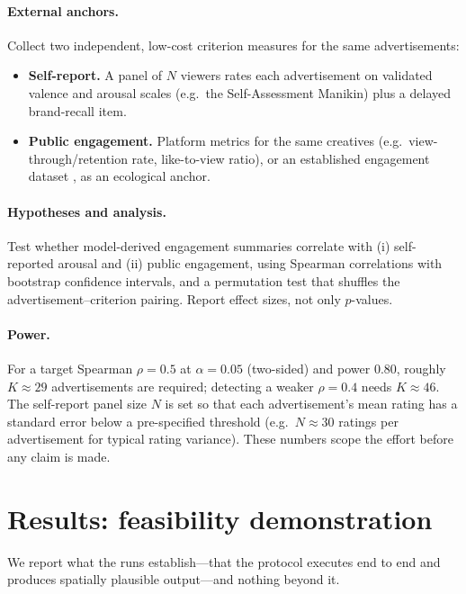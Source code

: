\documentclass[11pt]{article}
\begin{document}
\paragraph{External anchors.} Collect two independent, low-cost criterion
measures for the same advertisements:
\begin{itemize}[leftmargin=1.4em,itemsep=0.1em,topsep=0.2em]
  \item \textbf{Self-report.} A panel of $N$ viewers rates each advertisement
  on validated valence and arousal scales (e.g.\ the Self-Assessment Manikin)
  plus a delayed brand-recall item.
  \item \textbf{Public engagement.} Platform metrics for the same creatives
  (e.g.\ view-through/retention rate, like-to-view ratio), or an established
  engagement dataset \citep{kaggleads}, as an ecological anchor.
\end{itemize}

\paragraph{Hypotheses and analysis.} Test whether model-derived engagement
summaries correlate with (i) self-reported arousal and (ii) public engagement,
using Spearman correlations with bootstrap confidence intervals, and a
permutation test that shuffles the advertisement--criterion pairing. Report
effect sizes, not only $p$-values.

\paragraph{Power.} For a target Spearman $\rho=0.5$ at $\alpha=0.05$ (two-sided)
and power $0.80$, roughly $K\approx29$ advertisements are required; detecting a
weaker $\rho=0.4$ needs $K\approx46$. The self-report panel size $N$ is set so
that each advertisement's mean rating has a standard error below a
pre-specified threshold (e.g.\ $N\approx30$ ratings per advertisement for
typical rating variance). These numbers scope the effort before any claim is
made.

\section{Results: feasibility demonstration}
\label{sec:results}

We report what the runs establish---that the protocol executes end to end and
produces spatially plausible output---and nothing beyond it.
\end{document}
